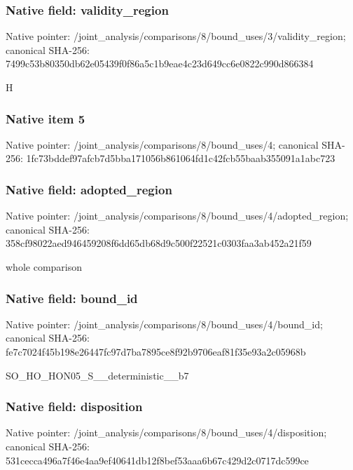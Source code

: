 \documentclass[10pt,a4paper]{article}
\begin{document}
\subsubsection{Native field: validity\_\allowbreak{}region}
Native pointer: /joint\_\allowbreak{}analysis/comparisons/8/bound\_\allowbreak{}uses/3/validity\_\allowbreak{}region; canonical SHA-256: 7499c53b80350db62e05439f0f86a5c1b9eae4c23d649cc6e0822c990d866384

\begingroup\raggedright\sloppy H\par\endgroup

\subsubsection{Native item 5}
Native pointer: /joint\_\allowbreak{}analysis/comparisons/8/bound\_\allowbreak{}uses/4; canonical SHA-256: 1fc73bddef97afcb7d5bba171056b861064fd1c42fcb55baab355091a1abc723

\subsubsection{Native field: adopted\_\allowbreak{}region}
Native pointer: /joint\_\allowbreak{}analysis/comparisons/8/bound\_\allowbreak{}uses/4/adopted\_\allowbreak{}region; canonical SHA-256: 358cf98022aed946459208f6dd65db68d9c500f22521c0303faa3ab452a21f59

\begingroup\raggedright\sloppy whole comparison\par\endgroup

\subsubsection{Native field: bound\_\allowbreak{}id}
Native pointer: /joint\_\allowbreak{}analysis/comparisons/8/bound\_\allowbreak{}uses/4/bound\_\allowbreak{}id; canonical SHA-256: fe7c7024f45b198e26447fc97d7ba7895ce8f92b9706eaf81f35e93a2c05968b

\begingroup\raggedright\sloppy SO\_\allowbreak{}HO\_\allowbreak{}HON05\_\allowbreak{}S\_\allowbreak{}\_\allowbreak{}deterministic\_\allowbreak{}\_\allowbreak{}b7\par\endgroup

\subsubsection{Native field: disposition}
Native pointer: /joint\_\allowbreak{}analysis/comparisons/8/bound\_\allowbreak{}uses/4/disposition; canonical SHA-256: 531cecca496a7f46e4aa9ef40641db12f8bef53aaa6b67c429d2c0717dc599ce
\end{document}
